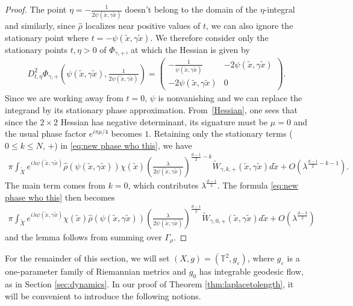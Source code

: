 \documentclass[11pt,letterpaper,oneside]{amsart}
\newcommand{\T}{\mathbb{T}}
\theoremstyle{definition}
\theoremstyle{remark}
\newcommand{\eps}{\varepsilon}
\newcommand{\wt}{\widetilde}
\newcommand{\wh}{\widehat}
\theoremstyle{definition}
\theoremstyle{remark}
\begin{document}
\begin{proof}
    The point $\eta = - \frac{1}{2 \psi(\wt x, \gamma \wt x)}$ doesn't belong to the domain of the $\eta$-integral and similarly, since $\wh \rho$ localizes near positive values of $t$, we can also ignore the stationary point where $t = - \psi(\wt x, \gamma \wt x)$. We therefore consider only the stationary points $t, \eta > 0$ of $\Phi_{\gamma,+}$, at which the Hessian is given by
    \begin{align}\label{Hessian}
        D_{t, \eta}^2 \Phi_{\gamma,+} \left(\psi (\wt x, \gamma \wt x), \frac{1}{2 \psi(\wt x, \gamma \wt x)} \right) =
        \begin{pmatrix}
            - \frac{1}{\psi (\wt x, \gamma \wt x)} & - 2 \psi(\wt x, \gamma \wt x)\\
            - 2 \psi(\wt x, \gamma \wt x)& 0
        \end{pmatrix}.
    \end{align}
    Since we are working away from $t = 0$, $\psi$ is nonvanishing and we can replace the integrand by its stationary phase approximation. From~\eqref{Hessian}, one sees that since the $2 \times 2$ Hessian has negative determinant, its signature must be $\mu = 0$ and the usual phase factor $e^{i \pi \mu/4}$ becomes $1$. Retaining only the stationary terms ($0 \leq k \leq N$, $+$) in \eqref{eq:new phase who this}, we have
    \begin{align*}
        \pi \int_{\wt X} e^{i  \lambda \psi(\wt x,\gamma  \wt x)} \wh \rho(\psi(\wt x, \gamma \wt x) )\chi(\wt x) \left(\frac{\lambda}{2 \psi( \wt x, \gamma \wt x)}\right)^{\frac{d- 1}{2} - k} \wt W_{\gamma, k,+}(\wt x, \gamma \wt x)  d \wt x + O\left(\lambda^{\frac{d-1}{2} - k - 1}\right).
    \end{align*}
    The main term comes from $k = 0$, which contributes $\lambda^{\frac{d-1}{2}}$. The formula \eqref{eq:new phase who this} then becomes
    \begin{align*}
        \pi \int_{\wt X} e^{i  \lambda \psi(\wt x,\gamma  \wt x)} \chi(\wt x) \wh \rho(\psi(\wt x, \gamma \wt x)) \left(\frac{\lambda}{2 \psi( \wt x, \gamma \wt x)}\right)^{\frac{d- 1}{2} } \wt W_{\gamma, 0,+}(\wt x, \gamma \wt x)  d \wt x + O\left(\lambda^{\frac{d-3}{2}}\right)
    \end{align*}
    and the lemma follows from summing over $\Gamma_\rho$.
\end{proof}

For the remainder of this section, we will set $(X,g) = (\T^2, g_\eps)$, where $g_\eps$ is a one-parameter family of Riemannian metrics and $g_0$ has integrable geodesic flow, as in Section \ref{sec:dynamics}. In our proof of Theorem \ref{thm:laplacetolength}, it will be convenient to introduce the following notions.
\end{document}
